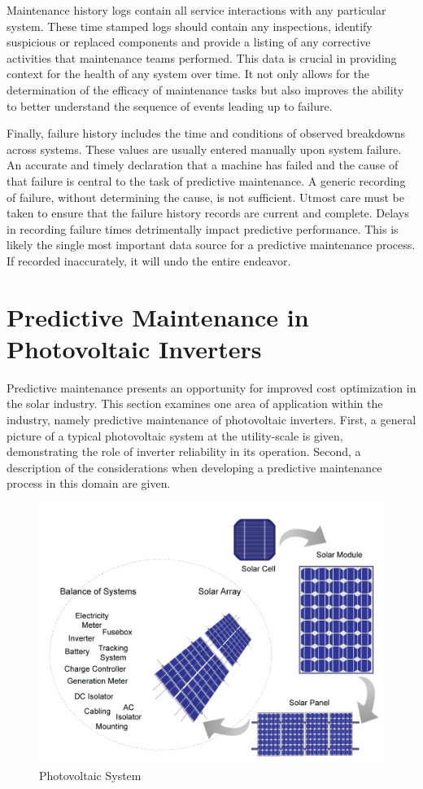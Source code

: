 Maintenance history logs contain all service interactions with any particular system. These time stamped logs should contain any inspections, identify suspicious or replaced components and provide a listing of any corrective activities that maintenance teams performed. This data is crucial in providing context for the health of any system over time. It not only allows for the determination of the efficacy of maintenance tasks but also improves the ability to better understand the sequence of events leading up to failure.

Finally, failure history includes the time and conditions of observed breakdowns across systems. These values are usually entered manually upon system failure. An accurate and timely declaration that a machine has failed and the cause of that failure is central to the task of predictive maintenance. A generic recording of failure, without determining the cause, is not sufficient. Utmost care must be taken to ensure that the failure history records are current and complete. Delays in recording failure times detrimentally impact predictive performance. This is likely the single most important data source for a predictive maintenance process. If recorded inaccurately, it will undo the entire endeavor. 

\section*{Predictive Maintenance in Photovoltaic Inverters}


Predictive maintenance presents an opportunity for improved cost optimization in the solar industry. This section examines one area of application within the industry, namely predictive maintenance of photovoltaic inverters. First, a general picture of a typical photovoltaic system at the utility-scale is given, demonstrating the role of inverter reliability in its operation. Second, a description of the considerations when developing a predictive maintenance process in this domain are given. 


\begin{figure}[ht!]
\centering
\includegraphics[width=350pt]{img/photovoltaic_system.png}
\caption{Photovoltaic System}
\label{pv_system}
\end{figure}

